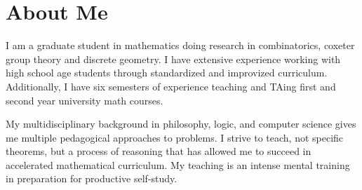 \section{\sc  About Me}

I am a graduate student in mathematics doing research in combinatorics, coxeter group theory and discrete geometry.  I have extensive experience working with high school age students through standardized and improvized curriculum.  Additionally, I have six semesters of experience teaching and TAing first and second year university math courses. \par My multidisciplinary background in philosophy, logic, and computer science gives me multiple pedagogical approaches to problems.  I strive to teach, not specific theorems, but a process of reasoning that has allowed me to succeed in accelerated mathematical curriculum. My teaching is an intense mental training in preparation for productive self-study. 